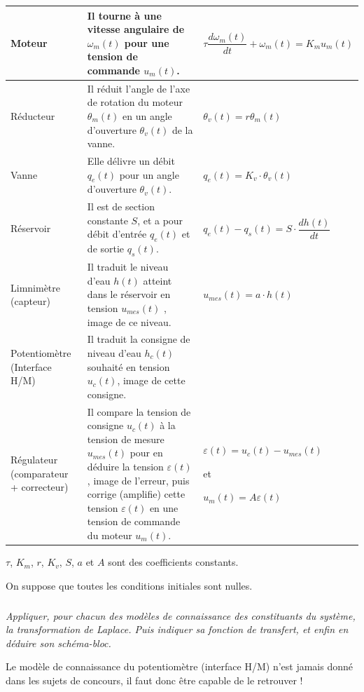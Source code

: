 \documentclass[10pt]{article}
\newif\ifprof
\begin{document}
\begin{center}
\begin{tabular}{|p{3cm}|p{7cm}|l|}
\hline
Moteur & 
Il tourne à une vitesse angulaire de $\omega_m(t)$ pour une tension de commande $u_m(t)$. &
$\tau \dfrac{d\omega_m(t)}{dt} + \omega_m(t) = K_m u_m(t)$ \\
\hline
Réducteur & 
Il réduit l'angle de l'axe de rotation du moteur $\theta_m(t)$
en un angle d'ouverture $\theta_v(t)$ de la vanne.&
$\theta_v(t)=r\theta_m(t)$\\
\hline
Vanne & 
Elle délivre un débit $q_e(t)$ pour un angle d'ouverture $\theta_v(t)$. &
$q_e(t)= K_v \cdot \theta_v(t) $ \\
\hline
Réservoir & 
Il est de section constante $S$, et a pour débit d’entrée
$q_e (t)$ et de sortie $q_s (t)$.&
$q_e(t)-q_s(t)=S\cdot\dfrac{dh(t)}{dt}$\\
\hline
Limnimètre (capteur) & 
Il traduit le niveau d'eau $h(t)$ atteint dans le réservoir
en tension $u_{mes}(t)$ , image de ce niveau. &
$u_{mes}(t) = a \cdot h(t)$ \\
\hline
Potentiomètre (Interface H/M) & 
Il traduit la consigne de niveau d'eau $h_c(t)$ souhaité
en tension $u_c(t)$, image de cette consigne. &
\\
\hline 
Régulateur (comparateur + correcteur) & 
Il compare la tension de consigne $u_c(t)$ à la tension
de mesure $u_{mes}(t)$ pour en déduire la tension $\varepsilon(t)$ ,
image de l’erreur, puis corrige (amplifie) cette tension
$\varepsilon (t)$ en une tension de commande du moteur $u_m(t)$.
&
$\varepsilon(t) = u_c(t)-u_{mes}(t)$

et

$u_m(t)=A\varepsilon(t)$\\
\hline
\end{tabular}
\end{center}

$\tau$, $K_m$, $r$, $K_v$, $S$, $a$ et $A$ sont des coefficients constants. 

On suppose que toutes les conditions initiales sont nulles.

\subparagraph{}
\textit{Appliquer, pour chacun des modèles de connaissance des constituants du système, la
transformation de Laplace. Puis indiquer sa fonction de transfert, et enfin en déduire son
schéma-bloc.}
\ifprof
\begin{corrige}
\end{corrige}
\else
\fi




Le modèle de connaissance du potentiomètre (interface H/M) n'est jamais donné dans les sujets de
concours, il faut donc être capable de le retrouver !
\end{document}
